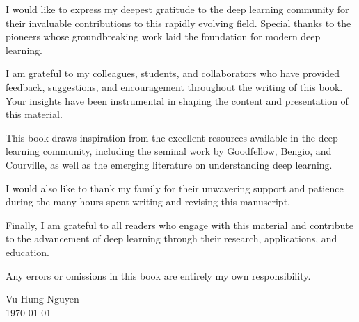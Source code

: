I would like to express my deepest gratitude to the deep learning community for their invaluable contributions to this rapidly evolving field. Special thanks to the pioneers whose groundbreaking work laid the foundation for modern deep learning.

I am grateful to my colleagues, students, and collaborators who have provided feedback, suggestions, and encouragement throughout the writing of this book. Your insights have been instrumental in shaping the content and presentation of this material.

This book draws inspiration from the excellent resources available in the deep learning community, including the seminal work by Goodfellow, Bengio, and Courville, as well as the emerging literature on understanding deep learning.

I would also like to thank my family for their unwavering support and patience during the many hours spent writing and revising this manuscript.

Finally, I am grateful to all readers who engage with this material and contribute to the advancement of deep learning through their research, applications, and education.

Any errors or omissions in this book are entirely my own responsibility.


\vspace{1cm}
\noindent Vu Hung Nguyen\\
\today
